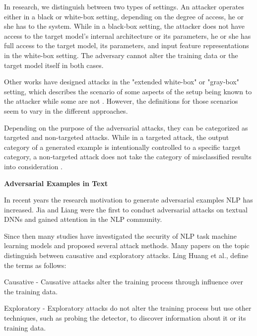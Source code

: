 In research, we distinguish between two types of settings.
An attacker operates either in a black or white-box setting, depending on the degree of access, he or she has to the system. While in a black-box setting, the attacker does not have access to the target model's internal architecture or its parameters, he or she has full access to the target model, its parameters, and input feature representations in the white-box setting. The adversary cannot alter the training data or the target model itself in both cases.

Other works have designed attacks in the "extended white-box" or "gray-box" setting, which describes the scenario of some aspects of the setup being known to the attacker while some are not \cite{vivek2018gray}. However, the definitions for those scenarios seem to vary in the different approaches.

Depending on the purpose of the adversarial attacks, they can be categorized as targeted and non-targeted attacks. While in a targeted attack, the output category of a generated example is intentionally controlled to a specific target category, a non-targeted attack does not take the category of misclassified results into consideration \cite{vijayaraghavan2019generating}.



\textbf{Adversarial Examples in Text}
    \label{sec:adversarial_exapmles_in_text}

In recent years the research motivation to generate adversarial examples NLP has increased. Jia and Liang were the first to conduct adversarial attacks on textual DNNs and gained attention in the NLP community\cite{Jia2017AdversarialEF}. 

Since then many studies have investigated the security of NLP task machine learning models and proposed several attack methods. Many papers on the topic distinguish between causative and exploratory attacks. Ling Huang et al., define the terms as follows:

Causative -  Causative attacks alter the training process through influence over the training data.

Exploratory - Exploratory attacks do not alter the training process but use other techniques, such as probing the detector, to discover information about it or its training data.

